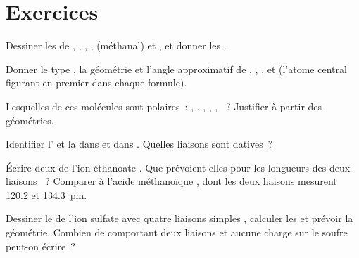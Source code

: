 \section{Exercices}

\begin{exercise}[$\star$]\label{exo:b1:lewis-resonance-vsepr:1}
Dessiner les  de , , , ,
 (méthanal) et , et donner les .
\end{exercise}

\begin{exercise}[$\star$]\label{exo:b1:lewis-resonance-vsepr:2}
Donner le type , la géométrie et l'angle approximatif de
, , ,  et  (l'atome
central figurant en premier dans chaque formule).
\end{exercise}

\begin{exercise}[$\star$]\label{exo:b1:lewis-resonance-vsepr:3}
Lesquelles de ces molécules sont polaires~: , ,
, , , ~? Justifier à partir des géométries.
\end{exercise}

\begin{exercise}[$\star$]\label{exo:b1:lewis-resonance-vsepr:4}
Identifier l' et la  dans 
et dans . Quelles liaisons sont
datives~?
\end{exercise}

\begin{exercise}[$\star\star$]\label{exo:b1:lewis-resonance-vsepr:5}
Écrire deux  de l'ion éthanoate . Que
prévoient-elles pour les longueurs des deux liaisons ~? Comparer
à l'acide méthanoïque , dont les deux liaisons 
mesurent 120.2 et \qty{134.3}{pm}.
\end{exercise}

\begin{exercise}[$\star\star$]\label{exo:b1:lewis-resonance-vsepr:6}
Dessiner le  de l'ion sulfate  avec quatre
liaisons simples , calculer les  et prévoir la
géométrie. Combien de  comportant deux liaisons
 et aucune charge sur le soufre peut-on écrire~?
\end{exercise}

